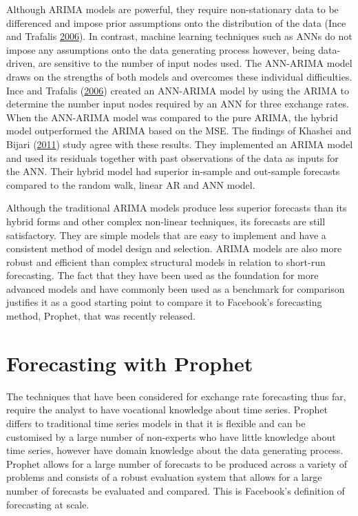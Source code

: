 \documentclass[12pt,preprint, authoryear]{elsarticle}
\numberwithin{equation}{section}
\numberwithin{figure}{section}
\numberwithin{table}{section}
\begin{document}
Although ARIMA models are powerful, they require non-stationary data to
be differenced and impose prior assumptions onto the distribution of the
data (Ince and Trafalis \protect\hyperlink{ref-ince2006}{2006}). In
contrast, machine learning techniques such as ANNs do not impose any
assumptions onto the data generating process however, being data-driven,
are sensitive to the number of input nodes used. The ANN-ARIMA model
draws on the strengths of both models and overcomes these individual
difficulties. Ince and Trafalis (\protect\hyperlink{ref-ince2006}{2006})
created an ANN-ARIMA model by using the ARIMA to determine the number
input nodes required by an ANN for three exchange rates. When the
ANN-ARIMA model was compared to the pure ARIMA, the hybrid model
outperformed the ARIMA based on the MSE. The findings of Khashei and
Bijari (\protect\hyperlink{ref-khashei2011}{2011}) study agree with
these results. They implemented an ARIMA model and used its residuals
together with past observations of the data as inputs for the ANN. Their
hybrid model had superior in-sample and out-sample forecasts compared to
the random walk, linear AR and ANN model.

Although the traditional ARIMA models produce less superior forecasts
than its hybrid forms and other complex non-linear techniques, its
forecasts are still satisfactory. They are simple models that are easy
to implement and have a consistent method of model design and selection.
ARIMA models are also more robust and efficient than complex structural
models in relation to short-run forecasting. The fact that they have
been used as the foundation for more advanced models and have commonly
been used as a benchmark for comparison justifies it as a good starting
point to compare it to Facebook's forecasting method, Prophet, that was
recently released.

\section{Forecasting with Prophet}\label{forecasting-with-prophet}

The techniques that have been considered for exchange rate forecasting
thus far, require the analyst to have vocational knowledge about time
series. Prophet differs to traditional time series models in that it is
flexible and can be customised by a large number of non-experts who have
little knowledge about time series, however have domain knowledge about
the data generating process. Prophet allows for a large number of
forecasts to be produced across a variety of problems and consists of a
robust evaluation system that allows for a large number of forecasts be
evaluated and compared. This is Facebook's definition of forecasting at
scale.
\end{document}
